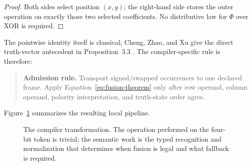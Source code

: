 \documentclass[10pt]{article}
\theoremstyle{plain}
\theoremstyle{definition}
\theoremstyle{remark}
\begin{document}
\begin{proof}
Both sides select position $(x,y)$; the right-hand side stores the outer operation on exactly those two selected coefficients. No distributive law for $\Phi$ over XOR is required.
\end{proof}

The pointwise identity itself is classical; Cheng, Zhao, and Xu give the direct truth-vector antecedent in Proposition~3.3 \cite{Cheng2011}. The compiler-specific rule is therefore:

\begin{quote}
\textbf{Admission rule.} Transport signed/swapped occurrences to one declared frame. Apply Equation~\eqref{eq:fusion-theorem} only after row operand, column operand, polarity interpretation, and truth-state order agree.
\end{quote}

Figure~\ref{fig:compiler-flow} summarizes the resulting local pipeline.

\begin{figure}[H]
\centering
{}
\caption{The compiler transformation. The operation performed on the four-bit token is trivial; the semantic work is the typed recognition and normalization that determines when fusion is legal and what fallback is required.}
\label{fig:compiler-flow}
\end{figure}
\end{document}

